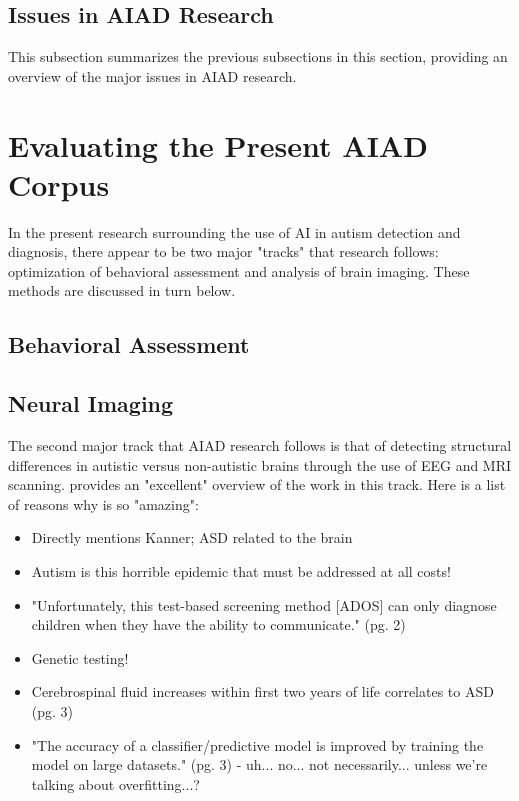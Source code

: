 \documentclass[letterpaper]{article}
\begin{document}
\subsection{Issues in AIAD Research}
This subsection summarizes the previous subsections in this section, providing an overview of the major issues in AIAD research. 

\section{Evaluating the Present AIAD Corpus}
In the present research surrounding the use of AI in autism detection and diagnosis, there appear to be two major "tracks" that research follows: optimization of behavioral assessment and analysis of brain imaging. These methods are discussed in turn below.

\subsection{Behavioral Assessment}

\subsection{Neural Imaging}
The second major track that AIAD research follows is that of detecting structural differences in autistic versus non-autistic brains through the use of EEG and MRI scanning. \cite{mri} provides an "excellent" overview of the work in this track. Here is a list of reasons why \cite{mri} is so "amazing":
\begin{itemize}
    \item Directly mentions Kanner; ASD related to the brain
    \item Autism is this horrible epidemic that must be addressed at all costs!
    \item "Unfortunately, this test-based screening method [ADOS] can only diagnose children when they have the ability to communicate." (pg. 2)
    \item Genetic testing!
    \item Cerebrospinal fluid increases within first two years of life correlates to ASD (pg. 3)
    \item "The accuracy of a classifier/predictive model is improved by training the model on large datasets." (pg. 3) - uh... no... not necessarily... unless we're talking about overfitting...?
\end{itemize}
\end{document}
